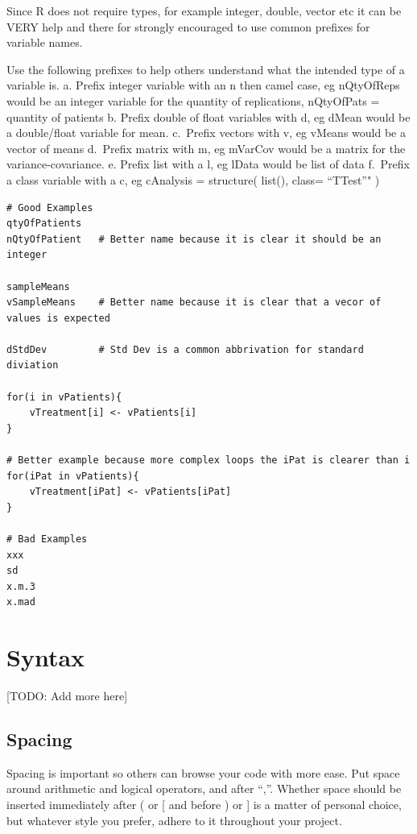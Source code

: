 \documentclass[
]{book}
\begin{document}
Since R does not require types, for example integer, double, vector etc it can be VERY help and there for strongly encouraged to use common prefixes for variable names.

Use the following prefixes to help others understand what the intended type of a variable is.
a. Prefix integer variable with an n then camel case, eg nQtyOfReps would be an integer variable for the quantity of replications, nQtyOfPats = quantity of patients
b. Prefix double of float variables with d, eg dMean would be a double/float variable for mean.
c.~Prefix vectors with v, eg vMeans would be a vector of means
d.~Prefix matrix with m, eg mVarCov would be a matrix for the variance-covariance.
e. Prefix list with a l, eg lData would be list of data
f.~Prefix a class variable with a c, eg cAnalysis = structure( list(), class= ``TTest''" )

\begin{verbatim}
# Good Examples
qtyOfPatients 
nQtyOfPatient   # Better name because it is clear it should be an integer

sampleMeans  
vSampleMeans    # Better name because it is clear that a vecor of values is expected

dStdDev         # Std Dev is a common abbrivation for standard diviation

for(i in vPatients){
    vTreatment[i] <- vPatients[i]
}

# Better example because more complex loops the iPat is clearer than i
for(iPat in vPatients){
    vTreatment[iPat] <- vPatients[iPat]
}

# Bad Examples
xxx
sd 
x.m.3   
x.mad 
\end{verbatim}

\hypertarget{syntax}{%
\chapter{Syntax}\label{syntax}}

{[}TODO: Add more here{]}

\hypertarget{spacing}{%
\section{Spacing}\label{spacing}}

Spacing is important so others can browse your code with more
ease. Put space around arithmetic and logical operators, and after
``,''. Whether space should be inserted immediately after ( or {[} and
before ) or {]} is a matter of personal choice, but whatever style you
prefer, adhere to it throughout your project.
\end{document}
